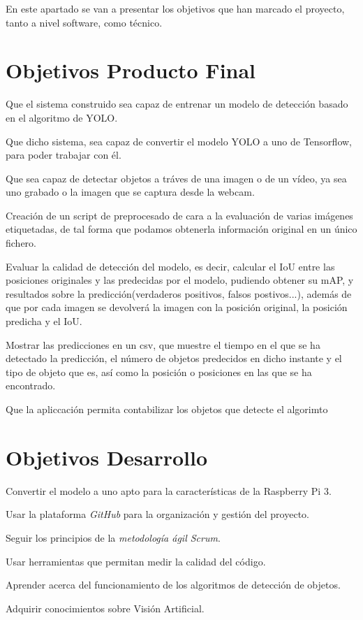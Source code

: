 
En este apartado se van a presentar los objetivos que han marcado el proyecto, tanto a nivel software, como técnico.

\section{Objetivos Producto Final}
\begin{list}{\textbullet}{ %
    \addtolength{\itemsep}{-2mm} %
    \setlength{\itemindent}{2mm}}

    \item Que el sistema construido sea capaz de entrenar un modelo de detección basado en el algoritmo de YOLO.
    \item Que dicho sistema, sea capaz de convertir el modelo YOLO a uno de Tensorflow, para poder trabajar con él. 
    \item Que sea capaz de detectar objetos a tráves de una imagen o de un vídeo, ya sea uno grabado o la imagen que se captura desde la webcam.
    \item Creación de un script de preprocesado de cara a la evaluación de varias imágenes etiquetadas, de tal forma que podamos obtenerla información original en un único fichero.
    \item Evaluar la calidad de detección del modelo, es decir, calcular el IoU entre las posiciones originales y las predecidas por el modelo, pudiendo obtener su mAP, y resultados sobre la predicción(verdaderos positivos, falsos postivos...), además de que por cada imagen se devolverá la imagen con la posición original, la posición predicha y el IoU.
    \item Mostrar las predicciones en un csv, que muestre el tiempo en el que se ha detectado la predicción, el número de objetos predecidos en dicho instante y el tipo de objeto que es, así como la posición o posiciones en las que se ha encontrado.
    \item Que la apliccación permita contabilizar los objetos que detecte el algorimto
\end{list}

\section{Objetivos Desarrollo}
\begin{list}{\textbullet}{ %
    \addtolength{\itemsep}{-2mm} %
    \setlength{\itemindent}{2mm}}

    \item Convertir el modelo a uno apto para la características de la Raspberry Pi 3.
    \item Usar la plataforma \textit{GitHub} para la organización y gestión del proyecto.
    \item Seguir los principios de la \textit{metodología ágil Scrum}.
    \item Usar herramientas que permitan medir la calidad del código.
    \item Aprender acerca del funcionamiento de los algoritmos de detección de objetos.
    \item Adquirir conocimientos sobre Visión Artificial.
\end{list}


